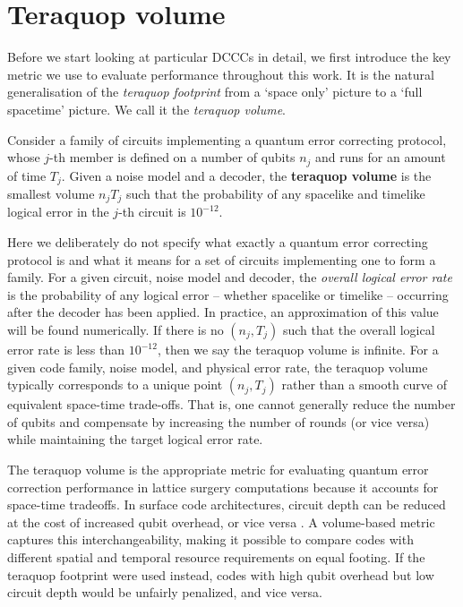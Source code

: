 \section{Teraquop volume}\label{sec:teraquop_volume}

Before we start looking at particular DCCCs in detail, we first introduce the key 
metric we use to evaluate performance throughout this work.
It is the natural generalisation of the \emph{teraquop footprint} \cite{gidney2021fault} from a `space only' picture to a `full spacetime' picture.
We call it the \emph{teraquop volume}.

\begin{definition}
    Consider a family of circuits implementing a quantum error correcting protocol, whose $j$-th member is defined on a number of qubits $n_j$ and runs for an amount of time $T_j$.
    Given a noise model and a decoder,
    the \textbf{teraquop volume} is the smallest volume $n_j T_j$ such that the probability of any spacelike and timelike logical error in the $j$-th circuit is $10^{-12}$.
\end{definition}

Here we deliberately do not specify what exactly a quantum error correcting protocol is and what it means for a set of circuits implementing one to form a family.
For a given circuit, noise model and decoder, the \emph{overall logical error rate} is the probability of any logical error -- whether spacelike or timelike -- occurring after the decoder has been applied.
In practice, an approximation of this value will be found numerically.
If there is no $(n_j, T_j)$ such that the overall logical error rate is less than $10^{-12}$, then we say the teraquop volume is infinite.
For a given code family, noise model, and physical error rate, the teraquop volume typically corresponds to a unique point $(n_j, T_j)$ rather than a smooth curve of equivalent space-time trade-offs.
That is, one cannot generally reduce the number of qubits and compensate by increasing the number of rounds (or vice versa) while maintaining the target logical error rate.

The teraquop volume is the appropriate metric for evaluating quantum error correction performance in lattice surgery computations because it accounts for space-time tradeoffs.
In surface code architectures, circuit depth can be reduced at the cost of increased qubit overhead, or vice versa \cite{lee2021even}.
A volume-based metric captures this interchangeability, making it possible to compare codes with different spatial and temporal resource requirements on equal footing.
If the teraquop footprint were used instead, codes with high qubit overhead but low circuit depth would be unfairly penalized, and vice versa.

